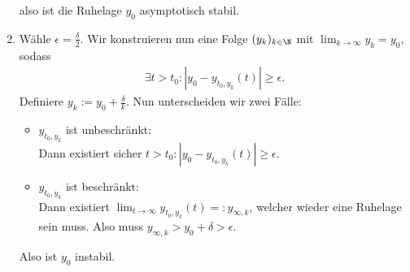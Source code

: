\begin{solution}
\begin{enumerate}[label = \textbf{\alph*)}]
also ist die Ruhelage $y_0$ asymptotisch stabil.
\item Wähle $\epsilon = \frac{\delta}{2}$. Wir konstruieren nun eine Folge
$(y_k)_{k \in \N}$ mit $\lim_{k \rightarrow \infty} y_k = y_0$, sodass
\begin{align*}
  \exists t > t_0: |y_0 - y_{t_0,y_k}(t) | \geq \epsilon.
\end{align*}
Definiere $y_k := y_0 + \frac{\delta}{k}$.
Nun unterscheiden wir zwei Fälle:
\begin{itemize}
  \item $y_{t_0,y_k}$ ist unbeschränkt: \\
  Dann existiert sicher $t > t_0: |y_0 - y_{t_0,y_k}(t) | \geq \epsilon.$
  \item $y_{t_0,y_k}$ ist beschränkt: \\
  Dann existiert $\lim_{t \rightarrow \infty} y_{t_0,y_k}(t) =: y_{\infty,k}$, welcher wieder
  eine Ruhelage sein muss. Also muss $y_{\infty,k} > y_0 + \delta > \epsilon$.
\end{itemize}
Also ist $y_0$ instabil.
\end{enumerate}
\end{solution}
